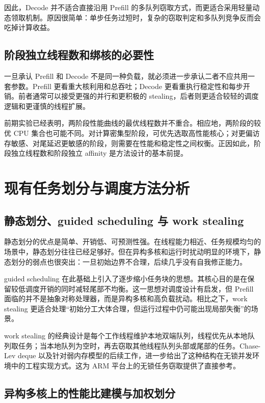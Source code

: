 因此，Decode 并不适合直接沿用 Prefill 的多队列窃取方式，而更适合采用轻量动态领取机制。原因很简单：单步任务过短时，复杂的窃取判定和多队列竞争反而会吃掉计算收益。

\subsection{阶段独立线程数和绑核的必要性}

一旦承认 Prefill 和 Decode 不是同一种负载，就必须进一步承认二者不应共用一套参数。Prefill 更看重大核利用和总吞吐；Decode 更看重执行稳定性和每步开销。前者通常可以接受更强的并行和更积极的 stealing，后者则更适合较轻的调度逻辑和更谨慎的线程扩展。

前期实验已经表明，两阶段性能曲线的最优线程数并不重合。相应地，两阶段的较优 CPU 集合也可能不同。对计算密集型阶段，可优先选取高性能核心；对更偏访存敏感、对尾延迟更敏感的阶段，则需要在性能和稳定性之间权衡。正因如此，阶段独立线程数和阶段独立 affinity 是方法设计的基本前提。

\section{现有任务划分与调度方法分析}

\subsection{静态划分、guided scheduling 与 work stealing}

静态划分的优点是简单、开销低、可预测性强。在线程能力相近、任务规模均匀的场景中，静态划分往往已经足够好。但在异构多核和运行时扰动明显的环境下，静态划分的弱点也很突出：一旦初始边界不合理，后续几乎没有自我修正能力。

guided scheduling 在此基础上引入了逐步缩小任务块的思想。其核心目的是在保留较低调度开销的同时减轻尾部不均衡\cite{polychronopoulos1987guided}。这一思想对调度设计有启发，但 Prefill 面临的并不是抽象对称处理器，而是异构多核和高负载扰动。相比之下，work stealing 更适合处理“初始分工大体合理，但运行过程中仍可能出现局部失衡”的场景\cite{blumofe1999workstealing,frigo1998cilk5}。

work stealing 的经典设计是每个工作线程维护本地双端队列，线程优先从本地队列取任务；当本地队列为空时，再去窃取其他线程队列头部或尾部的任务。Chase-Lev deque 以及针对弱内存模型的后续工作，进一步给出了这种结构在无锁并发环境中的工程实现方式\cite{chase2005deque,le2013weakmemory}。这为 ARM 平台上的无锁任务窃取提供了直接参考。

\subsection{异构多核上的性能比建模与加权划分}

